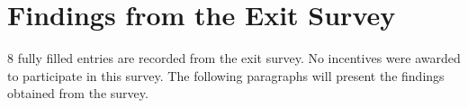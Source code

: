 %

\section{Findings from the Exit Survey}

8 fully filled entries are recorded from the exit survey. No incentives were awarded to participate in this survey. The following paragraphs will present the findings obtained from the survey.


